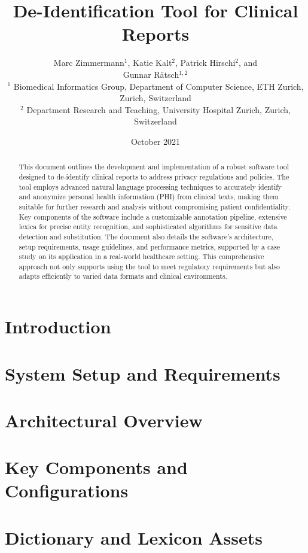 \documentclass[10pt,a4]{article}
\title{De-Identification Tool for Clinical Reports}
\author{Marc Zimmermann$^1$, Katie Kalt$^2$, Patrick Hirschi$^2$, and\\
  Gunnar R\"atsch$^{1,2}$\\
{\footnotesize $^1$ Biomedical Informatics Group, Department of Computer Science, ETH Zurich, Zurich, Switzerland}\\
{\footnotesize $^2$ Department Research and Teaching, University Hospital Zurich, Zurich, Switzerland}}
\date{October 2021}
\begin{document}
\maketitle

\begin{abstract}
This document outlines the development and implementation of a robust
software tool designed to de-identify clinical reports to address
privacy regulations and policies. The tool employs advanced natural
language processing techniques to accurately identify and anonymize
personal health information (PHI) from clinical texts, making them
suitable for further research and analysis without compromising
patient confidentiality. Key components of the software include a
customizable annotation pipeline, extensive lexica for precise entity
recognition, and sophisticated algorithms for sensitive data detection
and substitution. The document also details the software's
architecture, setup requirements, usage guidelines, and performance
metrics, supported by a case study on its application in a real-world
healthcare setting. This comprehensive approach not only supports
using the tool to meet regulatory requirements but also adapts
efficiently to varied data formats and clinical environments.
\end{abstract}

\newpage

\tableofcontents
\newpage

\section{Introduction}


\section{System Setup and Requirements}


\section{Architectural Overview}


\section{Key Components and Configurations}


\section{Dictionary and Lexicon Assets}

\end{document}
